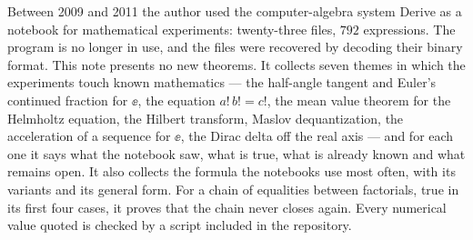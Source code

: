 Between 2009 and 2011 the author used the computer-algebra system Derive as a
notebook for mathematical experiments: twenty-three files, $792$ expressions.
The program is no longer in use, and the files were recovered by decoding
their binary format. This note presents no new theorems. It collects seven
themes in which the experiments touch known mathematics --- the half-angle
tangent and Euler's continued fraction for $\ee$, the equation $a!\,b!=c!$,
the mean value theorem for the Helmholtz equation, the Hilbert transform,
Maslov dequantization, the acceleration of a sequence for $\ee$, the Dirac
delta off the real axis --- and for each one it says what the notebook saw,
what is true, what is already known and what remains open. It also collects
the formula the notebooks use most often, with its variants and its general
form. For a chain of
equalities between factorials, true in its first four cases, it proves that
the chain never closes again. Every numerical value quoted is checked by a
script included in the repository.
